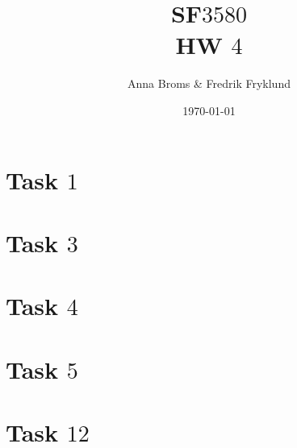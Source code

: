 \documentclass[a4paper]{article}
\title{SF$3580$\\HW $4$}
\author{Anna Broms \& Fredrik Fryklund}
\date{\today}
\begin{document}
\maketitle

 \section*{Task $1$}
 
 
  \section*{Task $3$}
  
 \section*{Task $4$}
 
 \section*{Task $5$}
 
\section*{Task $12$}

\end{document}
